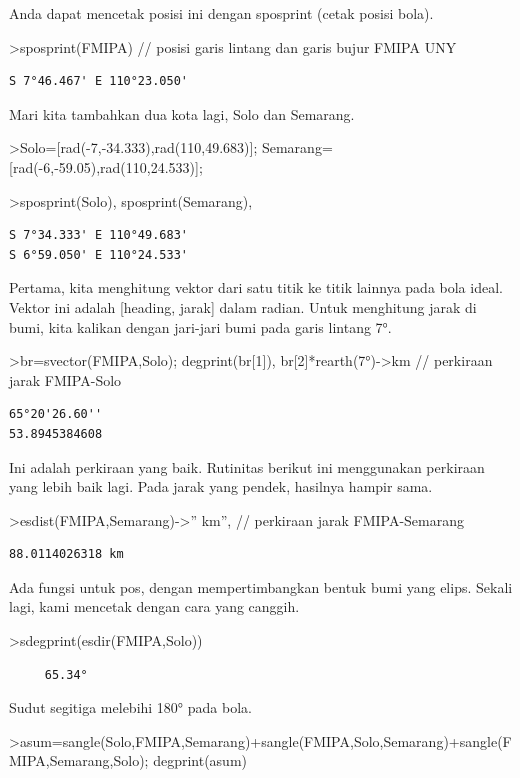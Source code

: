 \documentclass[
]{book}
\begin{document}
Anda dapat mencetak posisi ini dengan sposprint (cetak posisi bola).

\textgreater sposprint(FMIPA) // posisi garis lintang dan garis bujur FMIPA UNY

\begin{verbatim}
S 7°46.467' E 110°23.050'
\end{verbatim}

Mari kita tambahkan dua kota lagi, Solo dan Semarang.

\textgreater Solo={[}rad(-7,-34.333),rad(110,49.683){]}; Semarang={[}rad(-6,-59.05),rad(110,24.533){]};

\textgreater sposprint(Solo), sposprint(Semarang),

\begin{verbatim}
S 7°34.333' E 110°49.683'
S 6°59.050' E 110°24.533'
\end{verbatim}

Pertama, kita menghitung vektor dari satu titik ke titik lainnya pada bola ideal. Vektor ini adalah {[}heading, jarak{]} dalam radian. Untuk menghitung jarak di bumi, kita kalikan dengan jari-jari bumi pada garis lintang 7°.

\textgreater br=svector(FMIPA,Solo); degprint(br{[}1{]}), br{[}2{]}*rearth(7°)-\textgreater km // perkiraan jarak FMIPA-Solo

\begin{verbatim}
65°20'26.60''
53.8945384608
\end{verbatim}

Ini adalah perkiraan yang baik. Rutinitas berikut ini menggunakan perkiraan yang lebih baik lagi. Pada jarak yang pendek, hasilnya hampir sama.

\textgreater esdist(FMIPA,Semarang)-\textgreater'' km'', // perkiraan jarak FMIPA-Semarang

\begin{verbatim}
88.0114026318 km
\end{verbatim}

Ada fungsi untuk pos, dengan mempertimbangkan bentuk bumi yang elips. Sekali lagi, kami mencetak dengan cara yang canggih.

\textgreater sdegprint(esdir(FMIPA,Solo))

\begin{verbatim}
     65.34°
\end{verbatim}

Sudut segitiga melebihi 180° pada bola.

\textgreater asum=sangle(Solo,FMIPA,Semarang)+sangle(FMIPA,Solo,Semarang)+sangle(FMIPA,Semarang,Solo); degprint(asum)
\end{document}
